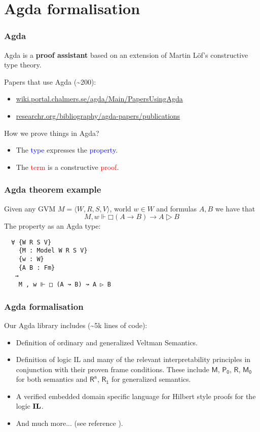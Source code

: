 \documentclass[xcolor={x11names}]{beamer}
\newcommand{\prin}[1]{\ensuremath{\textbf{\textup{#1}}}\xspace}
\newcommand{\il}{\prin{IL}}
\newcommand{\principle}[1]{\text{$\mathsf{#1}$}}
\begin{document}
\section{Agda formalisation}
\begin{frame}[fragile]
  \frametitle{Agda}
  Agda is a \textbf{proof assistant} based on an extension of Martin Löf's constructive
  type theory.

  \vspace{0.3cm}
  \pause
  Papers that use Agda (\textasciitilde 200):

  \begin{itemize}
  \item \href{https://wiki.portal.chalmers.se/agda/Main/PapersUsingAgda}{wiki.portal.chalmers.se/agda/Main/PapersUsingAgda}

  \item \href{https://researchr.org/bibliography/agda-papers/publications}{researchr.org/bibliography/agda-papers/publications}
  \end{itemize}

  \pause

  \vspace{0.3cm}
  How we prove things in Agda?
  \begin{itemize}
  \item The \textcolor{blue}{type} expresses the \textcolor{blue}{property}.
  \item The \textcolor{red}{term} is a constructive \textcolor{red}{proof}.
  \end{itemize}

\end{frame}

\begin{frame}[fragile]
  \frametitle{Agda theorem example}
  Given any GVM $M=⟨W,R,S,V⟩$, world $w∈W$ and formulas $A,B$ we have that
  \[M,w⊩□ (A → B) → A ▷ B\]
  \pause
  The property as an Agda type:
\begin{verbatim}
  ∀ {W R S V}
    {M : Model W R S V}
    {w : W}
    {A B : Fm}
   →
    M , w ⊩ □ (A ↝ B) ↝ A ▷ B
\end{verbatim}
\end{frame}

\begin{frame}
  \frametitle{Agda formalisation}
  Our Agda library includes (\textasciitilde 5k lines of code):
  \begin{itemize}
  \item Definition of ordinary and generalized Veltman Semantics.
  \item Definition of logic IL and many of the relevant interpretability
    principles in conjunction with their proven frame conditions. These include
    $\principle{M}$, $\principle{P_0}$, $\principle{R}$, $\principle{M_0}$ for
    both semantics and $\principle{R^n}$, $\principle{R_1}$ for generalized
    semantics.
  \item A verified embedded domain specific language for Hilbert style proofs
    for the logic \il.
  \item And much more... (see reference \cite{MasRovira:2020:MastersThesis}).
  \end{itemize}
\end{frame}
\end{document}
